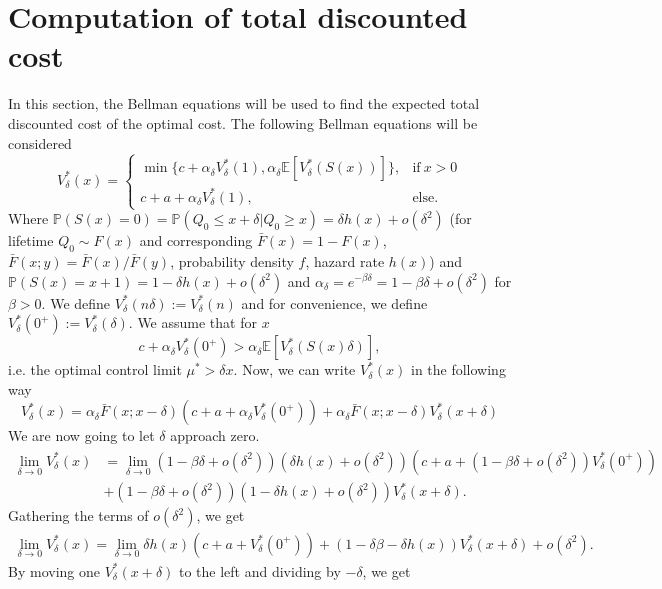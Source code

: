 \section{Computation of total discounted cost}
In this section, the Bellman equations will be used to find the expected total discounted cost of the optimal cost.
The following Bellman equations will be considered
\[V_\delta^*(x)=\begin{cases}
\min\{c+\alpha_\delta V^*_\delta(1),\alpha_\delta \mathbb{E}[V^*_\delta(S(x))]\},&\text{if}\ x>0 \\
c+a+\alpha_\delta V^*_\delta(1),&\text{else.}
\end{cases}\]
Where $\mathbb{P}(S(x)=0)=\mathbb{P}(Q_0\leq x+\delta|Q_0\geq x)=\delta h(x)+o(\delta^2)$ (for lifetime $Q_0\sim F(x)$ and corresponding $\bar F(x)=1-F(x)$, $\bar F(x;y)=\bar F(x)/\bar F(y)$, probability density $f$, hazard rate $h(x)$) and $\mathbb{P}(S(x)=x+1)=1-\delta h(x)+o(\delta^2)$ and $\alpha_\delta=e^{-\beta \delta}=1-\beta \delta + o(\delta^2)$ for $\beta>0$.
We define $V^*_\delta(n\delta):=V^*_\delta(n)$ and for convenience, we define $V^*_\delta(0^+):=V^*_\delta(\delta)$.
We assume that for $x$
$$
c+\alpha_\delta V^*_\delta(0^+)>\alpha_\delta \mathbb{E}[V^*_\delta(S(x)\delta)],
$$
i.e. the optimal control limit $\mu^*>\delta x$.
Now, we can write $V^*_\delta(x)$ in the following way
\[V^*_\delta(x)=\alpha_\delta \bar F(x;x-\delta) (c+a+\alpha_\delta V^*_\delta(0^+))
+\alpha_\delta \bar F(x;x-\delta)V^*_\delta(x+\delta)
\]
We are now going to let $\delta$ approach zero.
\begin{equation}
\begin{split}
\lim\limits_{\delta\rightarrow 0} V_\delta^*(x) &=
\lim\limits_{\delta\rightarrow 0}(1-\beta\delta+o(\delta^2)) (\delta h(x)+o(\delta^2))(c+a+(1-\beta\delta+o(\delta^2)) V^*_\delta(0^+))\\
&+(1-\beta\delta+o(\delta^2)) (1-\delta h(x)+o(\delta^2))V_\delta^*(x+\delta).
\end{split}
\end{equation}
Gathering the terms of $o(\delta^2)$, we get
\begin{equation}\label{eq:gatheredDelta}
\begin{split}
\lim\limits_{\delta\rightarrow 0} V_\delta^*(x) =
\lim\limits_{\delta\rightarrow 0}\delta h(x)(c+a+ V_\delta^*(0^+))+(1-\delta\beta-\delta h(x)) V_\delta^*(x+\delta)+o(\delta^2).
\end{split}
\end{equation}
By moving one $V_\delta^*(x+\delta)$ to the left and dividing by $-\delta$, we get
